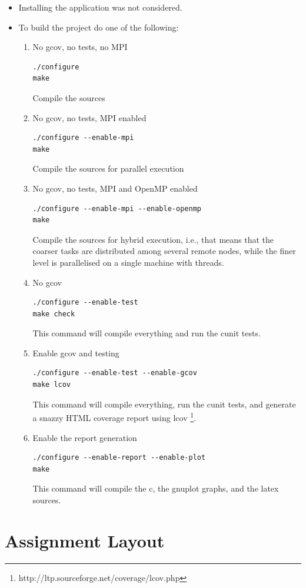 \documentclass[12pt,a4paper]{report}
\begin{document}
\begin{itemize}
\item Installing the application was not considered.
\item To build the project do one of the following:
  \begin{enumerate}
  \item No gcov, no tests, no MPI
\begin{verbatim}
./configure
make
\end{verbatim}
    Compile the sources
  \item No gcov, no tests, MPI enabled
\begin{verbatim}
./configure --enable-mpi
make
\end{verbatim}
    Compile the sources for parallel execution
  \item No gcov, no tests, MPI and OpenMP enabled
\begin{verbatim}
./configure --enable-mpi --enable-openmp
make
\end{verbatim}
    Compile the sources for hybrid execution, i.e., that means that
    the coarser tasks are distributed among several remote nodes,
    while the finer level is parallelised on a single machine with
    threads.
  \item No gcov
\begin{verbatim}
./configure --enable-test
make check
\end{verbatim}
    This command will compile everything and run the cunit tests.
  \item Enable gcov and testing
\begin{verbatim}
./configure --enable-test --enable-gcov
make lcov
\end{verbatim}
    This command will compile everything, run the cunit tests, and
    generate a snazzy HTML coverage report using lcov
    \footnote{http://ltp.sourceforge.net/coverage/lcov.php}.
  \item Enable the report generation
\begin{verbatim}
./configure --enable-report --enable-plot
make
\end{verbatim}
    This command will compile the c, the gnuplot graphs, and the latex
    sources.
  \end{enumerate}
\end{itemize}

\section{Assignment Layout}
\label{sec:assignment-layout}
\end{document}
